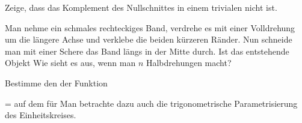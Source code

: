 {}
{





Zeige, dass das Komplement des Nullschnittes in einem trivialen
nicht
ist.





}
{} {}

{}
{





Man nehme ein schmales rechteckiges Band, verdrehe es mit einer Volldrehung um die längere Achse und verklebe die beiden kürzeren Ränder. Nun schneide man mit einer Schere das Band längs in  der Mitte durch. Ist das entstehende Objekt
Wie sieht es aus, wenn man $n$ Halbdrehungen macht?





}
{} {}

{}
{





Bestimme den
der Funktion

\mavergleichskette
{\vergleichskette
{ {  }
}
{ = }{ {  }
}
{  }{
}
{    }{
}
{   }{
}
}
{}{}{}
auf dem
für
 Man betrachte dazu auch die trigonometrische Parametrisierung des Einheitskreises.





}
{} {}
